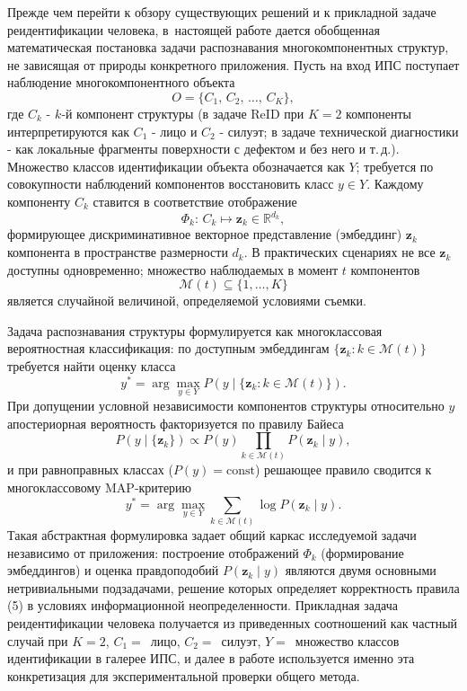 Прежде чем перейти к обзору существующих решений и к прикладной задаче
реидентификации человека, в~настоящей работе дается обобщенная математическая постановка
задачи распознавания многокомпонентных структур, не зависящая от природы
конкретного приложения. Пусть на вход ИПС поступает наблюдение
многокомпонентного объекта
\begin{equation}
    O=\{C_1,\,C_2,\,\ldots,\,C_K\},
\end{equation}
где $C_k$ - $k$‑й компонент структуры (в задаче ReID при $K=2$ компоненты
интерпретируются как $C_1$ - лицо и $C_2$ - силуэт; в задаче технической
диагностики - как локальные фрагменты поверхности с дефектом и без него
и т.\,д.). Множество классов идентификации объекта обозначается как $Y$;
требуется по совокупности наблюдений компонентов восстановить класс
$y\in Y$. Каждому компоненту $C_k$ ставится в соответствие отображение
\begin{equation}
    \Phi_k\colon\, C_k \mapsto \mathbf{z}_k\in\mathbb{R}^{d_k},
\end{equation}
формирующее дискриминативное векторное представление (эмбеддинг)
$\mathbf{z}_k$ компонента в пространстве размерности $d_k$. В практических
сценариях не все $\mathbf{z}_k$ доступны одновременно; множество
наблюдаемых в момент $t$ компонентов
\begin{equation}
    \mathcal{M}(t)\subseteq\{1,\ldots,K\}
\end{equation}
является случайной величиной, определяемой условиями съемки.

Задача распознавания структуры формулируется как многоклассовая
вероятностная классификация: по доступным эмбеддингам
$\{\mathbf{z}_k\colon k\in\mathcal{M}(t)\}$ требуется найти оценку
класса
\begin{equation}
    y^{*}=\arg\max_{y\in Y}P\!\left(y\mid\{\mathbf{z}_k\colon k\in\mathcal{M}(t)\}\right).
\end{equation}
При допущении условной независимости компонентов структуры
относительно $y$ апостериорная вероятность факторизуется по правилу Байеса
\begin{equation}
    P\!\left(y\mid\{\mathbf{z}_k\}\right)\propto P(y)\prod_{k\in\mathcal{M}(t)}P(\mathbf{z}_k\mid y),
\end{equation}
и при равноправных классах ($P(y)=\mathrm{const}$) решающее правило
сводится к многоклассовому MAP‑критерию
\begin{equation}
    y^{*}=\arg\max_{y\in Y}\sum_{k\in\mathcal{M}(t)}\log P(\mathbf{z}_k\mid y).
\end{equation}
Такая абстрактная формулировка задает общий каркас исследуемой задачи
независимо от приложения: построение отображений $\Phi_k$ (формирование
эмбеддингов) и оценка правдоподобий $P(\mathbf{z}_k\mid y)$ являются двумя
основными нетривиальными подзадачами, решение которых определяет
корректность правила (5) в условиях информационной неопределенности.
Прикладная задача реидентификации человека получается из приведенных
соотношений как частный случай при $K=2$, $C_1=$~лицо, $C_2=$~силуэт,
$Y=$~множество классов идентификации в галерее ИПС, и далее в работе используется
именно эта конкретизация для экспериментальной проверки общего метода.

